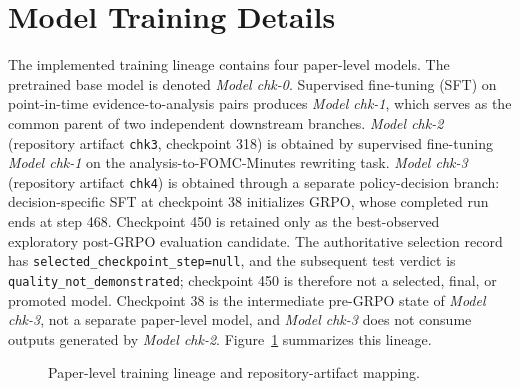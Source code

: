 \newcommand{\prompttag}[1]{\textcolor{blue}{\texttt{<|#1|>}}}

\section{Model Training Details}\label{ch2:sec:training}

The implemented training lineage contains four paper-level models. The pretrained
base model is denoted \textit{Model chk-0}. Supervised fine-tuning (SFT) on
point-in-time evidence-to-analysis pairs produces \textit{Model chk-1}, which
serves as the common parent of two independent downstream branches.
\textit{Model chk-2} (repository artifact \texttt{chk3}, checkpoint 318) is
obtained by supervised fine-tuning \textit{Model chk-1} on the
analysis-to-FOMC-Minutes rewriting task. \textit{Model chk-3} (repository
artifact \texttt{chk4}) is obtained through a separate policy-decision branch:
decision-specific SFT at checkpoint 38 initializes GRPO, whose completed run
ends at step 468. Checkpoint 450 is retained only as the best-observed
exploratory post-GRPO evaluation candidate. The authoritative selection record
has \texttt{selected\_checkpoint\_step=null}, and the subsequent test verdict is
\texttt{quality\_not\_demonstrated}; checkpoint 450 is therefore not a selected,
final, or promoted model. Checkpoint 38 is the intermediate pre-GRPO state of
\textit{Model chk-3}, not a separate paper-level model, and
\textit{Model chk-3} does not consume outputs generated by \textit{Model
chk-2}. Figure~\ref{fig:ch2:training_stage1} summarizes this lineage.

\begin{figure}[htbp]
    \centering
    \caption{Paper-level training lineage and repository-artifact mapping.}
    \label{fig:ch2:training_stage1}
\end{figure}


